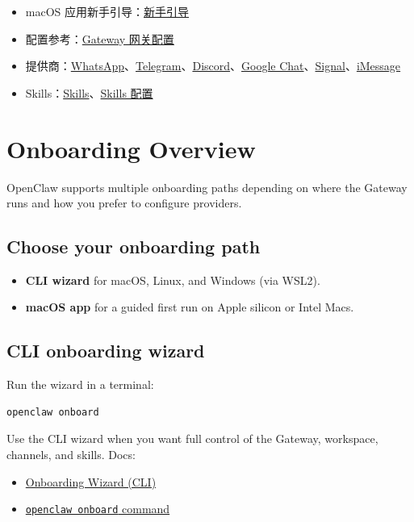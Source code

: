 \begin{itemize}
  \item macOS 应用新手引导：\href{/start/onboarding}{新手引导}
  \item 配置参考：\href{/gateway/configuration}{Gateway 网关配置}
  \item 提供商：\href{/channels/whatsapp}{WhatsApp}、\href{/channels/telegram}{Telegram}、\href{/channels/discord}{Discord}、\href{/channels/googlechat}{Google Chat}、\href{/channels/signal}{Signal}、\href{/channels/imessage}{iMessage}
  \item Skills：\href{/tools/skills}{Skills}、\href{/tools/skills-config}{Skills 配置}
\end{itemize}



\clearpage
\section{Onboarding Overview}


OpenClaw supports multiple onboarding paths depending on where the Gateway runs
and how you prefer to configure providers.

\subsection{Choose your onboarding path}


\begin{itemize}
  \item \textbf{CLI wizard} for macOS, Linux, and Windows (via WSL2).
  \item \textbf{macOS app} for a guided first run on Apple silicon or Intel Macs.
\end{itemize}


\subsection{CLI onboarding wizard}


Run the wizard in a terminal:

\begin{lstlisting}[language=bash]
openclaw onboard
\end{lstlisting}


Use the CLI wizard when you want full control of the Gateway, workspace,
channels, and skills. Docs:

\begin{itemize}
  \item \href{/start/wizard}{Onboarding Wizard (CLI)}
  \item \href{/cli/onboard}{\texttt{openclaw onboard} command}
\end{itemize}


